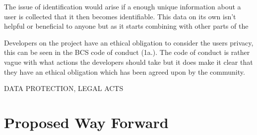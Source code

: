 \documentclass[a4paper]{article}
\begin{document}
\par
The issue of identification would arise if a enough unique information about a user is collected that it then becomes identifiable.
This data on its own isn't helpful or beneficial to anyone but as it starts combining with other parts of the
\\ \par
Developers on the project have an ethical obligation to consider the users privacy, this can be seen in the BCS code of conduct (1a.)\cite{bscCoC}.
The code of conduct is rather vague with what actions the developers should take but it does make it clear that they have an ethical obligation which has been agreed upon by the community.
\\ \par
DATA PROTECTION, LEGAL ACTS


\section{Proposed Way Forward}



\end{document}
